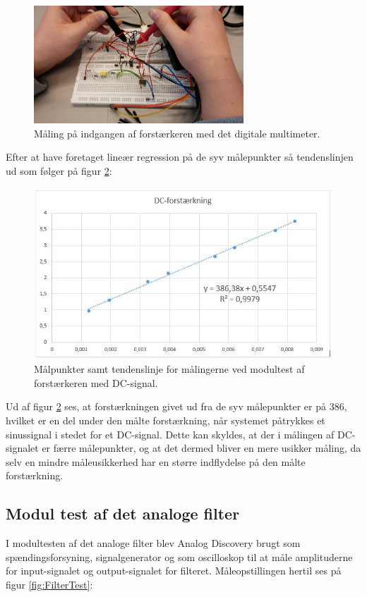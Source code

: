\begin{figure}[H]
	\centering
	\includegraphics[width=0.7\textwidth]{Figurer/Hardware/DigitalMultimeter}
	\caption{Måling på indgangen af forstærkeren med det digitale multimeter.}
	\label{fig:DigitalMulti}
\end{figure}

Efter at have foretaget lineær regression på de syv målepunkter så tendenslinjen ud som følger på figur \ref{fig:DCModul}:

\begin{figure}[H]
	\centering
	\includegraphics[width=1\textwidth]{Figurer/Hardware/DCforstaerkning}
	\caption{Målpunkter samt tendenslinje for målingerne ved modultest af forstærkeren med DC-signal.}
	\label{fig:DCModul}
\end{figure}

Ud af figur \ref{fig:DCModul} ses, at forstærkningen givet ud fra de syv målepunkter er på 386, hvilket er en del under den målte forstærkning, når systemet påtrykkes et sinussignal i stedet for et DC-signal. Dette kan skyldes, at der i målingen af DC-signalet er færre målepunkter, og at det dermed bliver en mere usikker måling, da selv en mindre måleusikkerhed har en større indflydelse på den målte forstærkning.

\subsection{Modul test af det analoge filter}
I modultesten af det analoge filter blev Analog Discovery brugt som spændingsforsyning, signalgenerator og som oscilloskop til at måle amplituderne for input-signalet og output-signalet for filteret. Måleopstillingen hertil ses på figur \ref{fig:FilterTest}:

